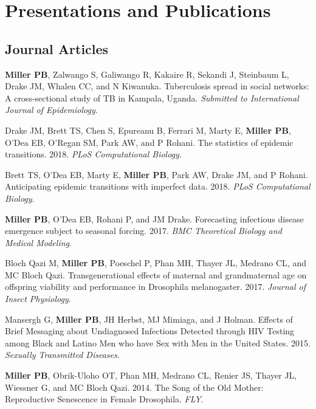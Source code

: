 \documentclass[letterpaper]{article}
\renewenvironment{itemize}{
  \begin{list}{}{
    \setlength{\leftmargin}{1.5em}
  }
}{
  \end{list}
}
\begin{document}
\section*{Presentations and Publications}

\subsection*{Journal Articles}

\begin{itemize}
\item \textbf{Miller PB}, Zalwango S, Galiwango R, Kakaire R, Sekandi J, Steinbaum L, Drake JM, Whalen CC, and N Kiwanuka. Tuberculosis spread in social networks: A cross-sectional study of TB in Kampala, Uganda. \textit{Submitted to International Journal of Epidemiology}. 
\item Drake JM, Brett TS,  Chen S, Epureanu B, Ferrari M, Marty E, \textbf{Miller PB}, O'Dea EB, O'Regan SM, Park AW, and P Rohani. The statistics of epidemic transitions. 2018. \textit{PLoS Computational Biology}. 
\item Brett TS,  O'Dea EB, Marty E, \textbf{Miller PB}, Park AW, Drake JM, and P Rohani. Anticipating epidemic transitions with imperfect data. 2018. \textit{PLoS Computational Biology}. 
\item \textbf{Miller PB}, O'Dea EB, Rohani P, and JM Drake. Forecasting infectious disease emergence subject to seasonal forcing. 2017. \textit{BMC Theoretical Biology and Medical Modeling}.
\item Bloch Qazi M, \textbf{Miller PB}, Poeschel P, Phan MH, Thayer JL, Medrano CL, and MC Bloch Qazi. Transgenerational effects of maternal and grandmaternal age on offspring viability and performance in Drosophila melanogaster. 2017. \textit{Journal of Insect Physiology}.
\item Mansergh G, \textbf{Miller PB}, JH Herbst, MJ Mimiaga, and J Holman. Effects of Brief Messaging about Undiagnosed Infections Detected through HIV Testing among Black and Latino Men who have Sex with Men in the United States. 2015. \textit{Sexually Transmitted Diseases}.
\item \textbf{Miller PB}, Obrik-Uloho OT, Phan MH, Medrano CL, Renier JS, Thayer JL, Wiessner G, and MC Bloch Qazi. 2014. The Song of the Old Mother: Reproductive Senescence in Female Drosophila. \textit{FLY}.
\end{itemize}
\end{document}
